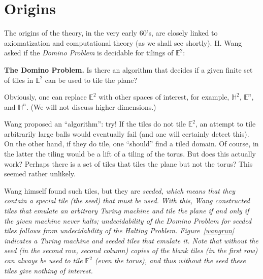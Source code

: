 \documentclass[12pt,reqno]{amsart}
\theoremstyle{plain}
\theoremstyle{definition}
\numberwithin{subcase}{case}
\theoremstyle{plain}
\theoremstyle{definition}
\begin{document}
\section{Origins}
The origins of the theory, in the very early 60's, are closely linked to axiomatization and computational theory (as we shall see shortly). H. Wang~\cite{MR1112395} asked if the {\it Domino Problem} is decidable for tilings of \(\mathbb{E}^{2}\): 

{\bf The Domino Problem.} Is there an algorithm that decides if a given finite set of tiles in \(\mathbb{E}^{2}\) can be used to tile the plane? 

Obviously, one can replace \(\mathbb{E}^{2}\) with other spaces of interest, for example, \(\mathbb{H}^{2}\), \(\mathbb{E}^{n}\), and \(\mathbb{H}^{n}\). (We will not discuss higher dimensions.)

Wang proposed an ``algorithm'': try! If the tiles do not tile \(\mathbb{E}^{2}\), an attempt to tile arbitrarily large balls would eventually fail (and one will certainly detect this). On the other hand, if they do tile, one ``should'' find a tiled domain. Of course, in the latter the tiling would be a lift of a tiling of the torus. But does this actually work? Perhaps there is a set of tiles that tiles the plane but not the torus? This seemed rather unlikely. 

Wang himself found such tiles, but they are \em seeded\em, which means that they contain a special tile (the seed) that must be used. With this, Wang constructed tiles that emulate an arbitrary Turing machine and tile the plane if and only if the given machine never halts; undecidability of the Domino Problem for seeded tiles follows from undecidability of the Halting Problem.  Figure~\ref{wangrun} indicates a Turing machine and seeded tiles that emulate it. Note that without the seed (in the second row, second column) copies of the blank tiles (in the first row) can always be used to tile \(\mathbb{E}^{2}\) (even the torus), and thus without the seed these tiles give nothing of interest. 
\end{document}
